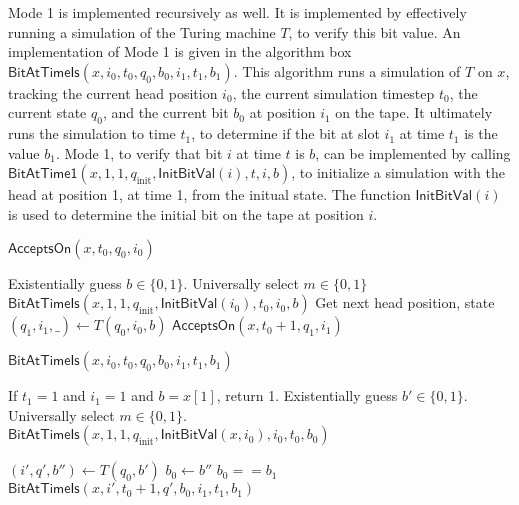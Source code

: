\documentclass{article}
\begin{document}
Mode 1 is implemented recursively as well.
It is implemented by effectively running a simulation of the Turing machine $T$, to verify this bit value.
An implementation of Mode 1 is given in the algorithm box $\mathsf{BitAtTimeIs}(x, i_0, t_0, q_0, b_0, i_1, t_1, b_1)$.
This algorithm runs a simulation of $T$ on $x$, tracking the current head position $i_0$, the current simulation timestep $t_0$, the current state $q_0$, and the current bit $b_0$ at position $i_1$ on the tape.
It ultimately runs the simulation to time $t_1$, to determine if the bit at slot $i_1$ at time $t_1$ is the value $b_1$.
Mode 1, to verify that bit $i$ at time $t$ is $b$, can be implemented by calling $\mathsf{BitAtTime1}(x, 1, 1, q_\text{init}, \mathsf{InitBitVal}(i), t, i, b)$, to initialize a simulation with the head at position 1, at time 1, from the initual state.  The function $\mathsf{InitBitVal}(i)$ is used to determine the initial bit on the tape at position $i$.

\begin{algorithm}{$\mathsf{AcceptsOn}(x, t_0, q_0, i_0)$}
\begin{algorithmic}
\STATE {}
\ELSE
\STATE Existentially guess $b \in \{0, 1\}$.
\STATE Universally select $m \in \{0, 1\}$
\RETURN $\mathsf{BitAtTimeIs}(x, 1, 1, q_\text{init}, \mathsf{InitBitVal}(i_0), t_0, i_0, b)$
\ELSE
\STATE Get next head position, state $(q_1, i_1, \_) \gets T(q_0, i_0, b)$
\RETURN $\mathsf{AcceptsOn}(x, t_0 + 1, q_1, i_1)$
\ENDIF
\ENDIF
\end{algorithmic}
\end{algorithm}

\begin{algorithm}{$\mathsf{BitAtTimeIs}(x, i_0, t_0, q_0, b_0, i_1, t_1, b_1)$}
\begin{algorithmic}
\STATE {}
\STATE If $t_1 = 1$ and $i_1 = 1$ and $b = x[1]$, return 1.
\STATE Existentially guess $b' \in \{0, 1\}$.
\STATE Universally select $m \in \{0, 1\}$.
\RETURN $\mathsf{BitAtTimeIs}(x, 1, 1, q_\text{init}, \mathsf{InitBitVal}(x, i_0), i_0, t_0, b_0)$  
\ELSE
\STATE {}

\STATE $(i', q', b'') \gets T(q_0, b')$ 
\STATE $b_0 \gets b''$
\ENDIF
{}
\RETURN $b_0 == b_1$
\ENDIF
\RETURN $\mathsf{BitAtTimeIs}(x, i', t_0 + 1, q', b_0, i_1, t_1, b_1)$
\ENDIF
\end{algorithmic}
\end{algorithm}
\end{document}
